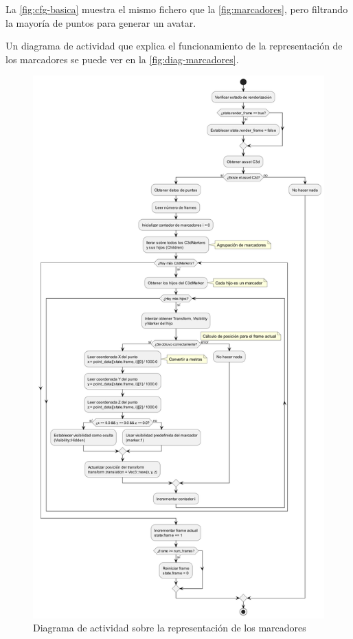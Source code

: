La \autoref{fig:cfg-basica} muestra el mismo fichero que la \autoref{fig:marcadores}, pero filtrando la mayoría de puntos para generar un avatar.

Un diagrama de actividad que explica el funcionamiento de la representación de los marcadores se puede ver en la \autoref{fig:diag-marcadores}.

\begin{figure}[H]
  \centering
  \includegraphics[height=0.9\textheight, keepaspectratio]{imagenes/diagramas/marcadores.png}
  \caption{Diagrama de actividad sobre la representación de los marcadores}
  \label{fig:diag-marcadores}
\end{figure}

